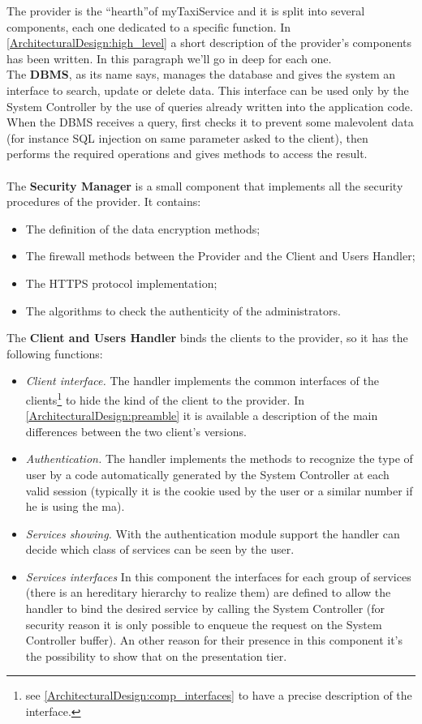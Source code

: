 \documentclass[\mainpath/main]{subfiles}
\begin{document}
The provider is the \textquotedblleft hearth\textquotedblright of myTaxiService and it is split into several components, each one dedicated to a specific function. In \autoref{ArchitecturalDesign:high_level} a short description of the provider's components has been written. In this paragraph we'll go in deep for each one.\\
The \textbf{DBMS}, as its name says, manages the database and gives the system an interface to search, update or delete data. This interface can be used only by the System Controller by the use of queries already written into the application code. When the DBMS receives a query, first checks it to prevent some malevolent data (for instance SQL injection on same parameter asked to the client), then performs the required operations and gives methods to access the result.\\
\\
The \textbf{Security Manager} is a small component that implements all the security procedures of the provider. It contains:
\begin{itemize}
	\item The definition of the data encryption methods;
	\item The firewall methods between the Provider and the Client and Users Handler;
	\item The HTTPS protocol implementation;
	\item The algorithms to check the authenticity of the administrators. \\
\end{itemize}

The \textbf{Client and Users Handler} binds the clients to the provider, so it has the following functions:
\begin{itemize}
	\item \textit{Client interface.} The handler implements the common interfaces of the clients\footnote{see \autoref{ArchitecturalDesign:comp_interfaces} to have a precise description of the interface.} to hide the kind of the client to the provider. In \autoref{ArchitecturalDesign:preamble} it is available a description of the main differences between the two client's versions.
	\item \textit{Authentication.} The handler implements the methods to recognize the type of user by a code automatically generated by the System Controller at each valid session (typically it is the cookie used by the user or a similar number if he is using the \gls{ma}).
	\item \textit{Services showing.} With the authentication module support the handler can decide which class of services can be seen by the user.
	\item \textit{Services interfaces} In this component the interfaces for each group of services (there is an hereditary hierarchy to realize them) are defined to allow the handler to bind the desired service by calling the System Controller (for security reason it is only possible to enqueue the request on the System Controller buffer). An other reason for their presence in this component it's the possibility to show that on the presentation tier.\\
\end{itemize}
\end{document}
